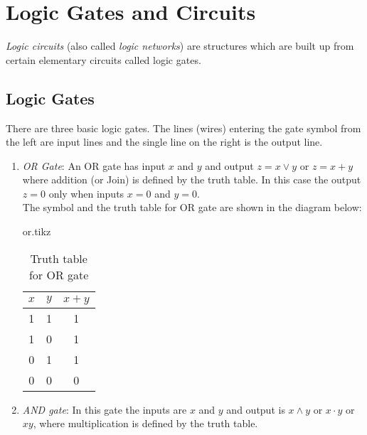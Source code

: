 \documentclass[../main-sheet.tex]{subfiles}
\begin{document}
\section{Logic Gates and Circuits}
\begin{defn}
    \emph{Logic circuits} (also called \emph{logic networks}) are structures which are built up from certain elementary circuits called logic gates.    
\end{defn}
\subsection{Logic Gates}
    There are three basic logic gates. The lines (wires) entering the gate symbol from the left are input lines and the single line on the right is the output line.
    \begin{enumerate}
        \item \emph{OR Gate}: An OR gate has input $ x $ and $ y $ and output $ z = x \lor y $ or $ z=x+y  $ where addition (or Join) is defined by the truth table. In this case the output $ z = 0 $ only when inputs $ x = 0 $ and $ y = 0 $.\\
        The symbol and the truth table for OR gate are shown in the diagram below:
        \begin{table}[H]
            \begin{minipage}[c]{0.5\textwidth}
                \centering
                {or.tikz}
            \end{minipage}\hfill
            \begin{minipage}[c]{0.5\textwidth}
                \centering
                \begin{tabular}{ccc}
                    \toprule
                    $ x $ &$ y $& $ x+y $\\
                    \midrule
                    1 & 1 & 1\\
                    1&0&1\\
                    0&1&1\\
                    0&0&0\\
                    \bottomrule
                \end{tabular}
                \caption{Truth table for OR gate}
            \end{minipage}
        \end{table}
        \item \emph{AND gate}: In this gate the inputs are $ x $ and $ y $ and output is $ x \land y $ or $ x\cdot y $ or $ xy $, where multiplication is defined by the truth table.

\end{enumerate}
\end{document}
